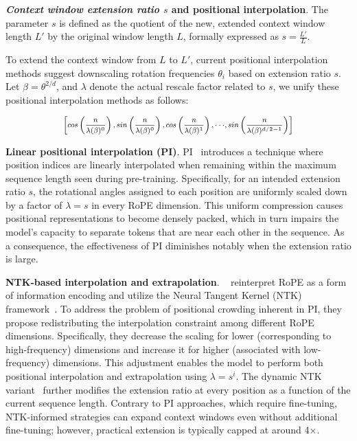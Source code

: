 \textbf{\emph{Context window extension ratio $s$} and positional interpolation}. The parameter $s$ is defined as the quotient of the new, extended context window length $L'$ by the original window length $L$, formally expressed as $s = \frac{L'}{L}$.

To extend the context window from $L$ to $L'$, current positional interpolation methods suggest downscaling rotation frequencies $\theta_i$ based on extension ratio $s$. Let $\beta=\theta^{2/d}$, and $\lambda$ denote the actual rescale factor related to $s$, we   unify these positional interpolation methods as follows:

\begin{equation}	
	\fontsize{7.5}{7.5} \selectfont
	\label{eq:unified_rope}
	\begin{aligned}
		\left[cos\left(\frac{n}{\lambda(\beta)^0}\right), sin \left(\frac{n}{\lambda(\beta)^0}\right), cos\left(\frac{n}{\lambda(\beta)^1}\right), \cdot\cdot\cdot,  sin \left(\frac{n}{\lambda(\beta)^{d/2-1}}\right) \right]   
	\end{aligned}
\end{equation}

\textbf{Linear positional interpolation (PI)}. PI~\cite{pi} introduces a technique where position indices are linearly interpolated when remaining within the maximum sequence length seen during pre-training. Specifically, for an intended extension ratio $s$, the rotational angles assigned to each position are uniformly scaled down by a factor of $\lambda = s$ in every RoPE dimension. This uniform compression causes positional representations to become densely packed, which in turn impairs the model's capacity to separate tokens that are near each other in the sequence. As a consequence, the effectiveness of PI diminishes notably when the extension ratio is large.

\textbf{NTK-based interpolation and extrapolation}. ~\cite{ntk,dynamicntk} reinterpret RoPE as a form of information encoding and utilize the Neural Tangent Kernel (NTK) framework~\cite{jacot2018neural,tancik2020fourier}. To address the problem of positional crowding inherent in PI, they propose redistributing the interpolation constraint among different RoPE dimensions. Specifically, they decrease the scaling for lower (corresponding to high-frequency) dimensions and increase it for higher (associated with low-frequency) dimensions. This adjustment enables the model to perform both positional interpolation and extrapolation using $\lambda=s^{i}$. The dynamic NTK variant~\cite{dynamicntk} further modifies the extension ratio at every position as a function of the current sequence length. Contrary to PI approaches, which require fine-tuning, NTK-informed strategies can expand context windows even without additional fine-tuning; however, practical extension is typically capped at around 4$\times$.

